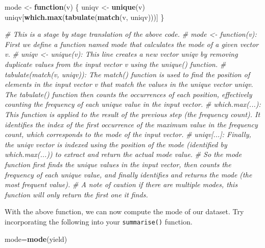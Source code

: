 \documentclass[
]{book}
\newenvironment{Shaded}{\begin{snugshade}}{\end{snugshade}}
\newcommand{\CommentTok}[1]{\textcolor[rgb]{0.56,0.35,0.01}{\textit{#1}}}
\newcommand{\ControlFlowTok}[1]{\textcolor[rgb]{0.13,0.29,0.53}{\textbf{#1}}}
\newcommand{\FunctionTok}[1]{\textcolor[rgb]{0.13,0.29,0.53}{\textbf{#1}}}
\newcommand{\NormalTok}[1]{#1}
\newcommand{\OtherTok}[1]{\textcolor[rgb]{0.56,0.35,0.01}{#1}}
\begin{document}
\begin{Shaded}
\begin{Highlighting}[]
\NormalTok{mode }\OtherTok{\textless{}{-}} \ControlFlowTok{function}\NormalTok{(v) \{}
\NormalTok{  uniqv }\OtherTok{\textless{}{-}} \FunctionTok{unique}\NormalTok{(v)}
\NormalTok{  uniqv[}\FunctionTok{which.max}\NormalTok{(}\FunctionTok{tabulate}\NormalTok{(}\FunctionTok{match}\NormalTok{(v, uniqv)))]}
\NormalTok{\}}

\CommentTok{\# This is a stage by stage translation of the above code.}
\CommentTok{\# mode \textless{}{-} function(v): First we define a function named mode that calculates the mode of a given vector v.}
\CommentTok{\# uniqv \textless{}{-} unique(v): This line creates a new vector uniqv by removing duplicate values from the input vector v using the unique() function.}
\CommentTok{\# tabulate(match(v, uniqv)): The match() function is used to find the position of elements in the input vector v that match the values in the unique vector uniqv. The tabulate() function then counts the occurrences of each position, effectively counting the frequency of each unique value in the input vector.}
\CommentTok{\# which.max(...): This function is applied to the result of the previous step (the frequency count). It identifies the index of the first occurrence of the maximum value in the frequency count, which corresponds to the mode of the input vector.}
\CommentTok{\# uniqv[...]: Finally, the uniqv vector is indexed using the position of the mode (identified by which.max(...)) to extract and return the actual mode value.}
\CommentTok{\# So the mode function first finds the unique values in the input vector, then counts the frequency of each unique value, and finally identifies and returns the mode (the most frequent value).}
\CommentTok{\# A note of caution if there are multiple modes, this function will only return the first one it finds.}
\end{Highlighting}
\end{Shaded}

With the above function, we can now compute the mode of our dataset. Try incorporating the following into your \texttt{summarise()} function.

\begin{Shaded}
\begin{Highlighting}[]
\NormalTok{mode}\OtherTok{=}\FunctionTok{mode}\NormalTok{(yield)}
\end{Highlighting}
\end{Shaded}
\end{document}
